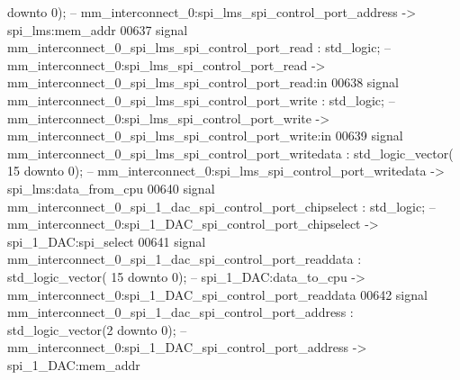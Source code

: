 \begin{DoxyCode}
       \textcolor{keywordflow}{downto} \textcolor{vhdllogic}{}\textcolor{vhdllogic}{0}\textcolor{vhdlchar}{)};\textcolor{keyword}{  -- mm\_interconnect\_0:spi\_lms\_spi\_control\_port\_address -> spi\_lms:mem\_addr}
00637     \textcolor{keywordflow}{signal} \textcolor{vhdlchar}{mm_interconnect_0_spi_lms_spi_control_port_read}                             \textcolor{vhdlchar}{:} \textcolor{comment}{std\_logic};\textcolor{keyword}{        
                   -- mm\_interconnect\_0:spi\_lms\_spi\_control\_port\_read ->
       mm\_interconnect\_0\_spi\_lms\_spi\_control\_port\_read:in}
00638     \textcolor{keywordflow}{signal} \textcolor{vhdlchar}{mm_interconnect_0_spi_lms_spi_control_port_write}                            \textcolor{vhdlchar}{:} \textcolor{comment}{std\_logic};\textcolor{keyword}{        
                   -- mm\_interconnect\_0:spi\_lms\_spi\_control\_port\_write ->
       mm\_interconnect\_0\_spi\_lms\_spi\_control\_port\_write:in}
00639     \textcolor{keywordflow}{signal} \textcolor{vhdlchar}{mm_interconnect_0_spi_lms_spi_control_port_writedata}                        \textcolor{vhdlchar}{:} \textcolor{comment}{std\_logic\_vector}\textcolor{vhdlchar}{(}\textcolor{vhdllogic}{}\textcolor{vhdllogic}{
      15} \textcolor{keywordflow}{downto} \textcolor{vhdllogic}{}\textcolor{vhdllogic}{0}\textcolor{vhdlchar}{)};\textcolor{keyword}{ -- mm\_interconnect\_0:spi\_lms\_spi\_control\_port\_writedata -> spi\_lms:data\_from\_cpu}
00640     \textcolor{keywordflow}{signal} \textcolor{vhdlchar}{mm_interconnect_0_spi_1_dac_spi_control_port_chipselect}                     \textcolor{vhdlchar}{:} \textcolor{comment}{std\_logic};\textcolor{keyword}{        
                   -- mm\_interconnect\_0:spi\_1\_DAC\_spi\_control\_port\_chipselect -> spi\_1\_DAC:spi\_select}
00641     \textcolor{keywordflow}{signal} \textcolor{vhdlchar}{mm_interconnect_0_spi_1_dac_spi_control_port_readdata}                       \textcolor{vhdlchar}{:} \textcolor{comment}{std\_logic\_vector}\textcolor{vhdlchar}{(}\textcolor{vhdllogic}{}\textcolor{vhdllogic}{
      15} \textcolor{keywordflow}{downto} \textcolor{vhdllogic}{}\textcolor{vhdllogic}{0}\textcolor{vhdlchar}{)};\textcolor{keyword}{ -- spi\_1\_DAC:data\_to\_cpu -> mm\_interconnect\_0:spi\_1\_DAC\_spi\_control\_port\_readdata}
00642     \textcolor{keywordflow}{signal} \textcolor{vhdlchar}{mm_interconnect_0_spi_1_dac_spi_control_port_address}                        \textcolor{vhdlchar}{:} \textcolor{comment}{std\_logic\_vector}\textcolor{vhdlchar}{(}\textcolor{vhdllogic}{}\textcolor{vhdllogic}{2}
       \textcolor{keywordflow}{downto} \textcolor{vhdllogic}{}\textcolor{vhdllogic}{0}\textcolor{vhdlchar}{)};\textcolor{keyword}{  -- mm\_interconnect\_0:spi\_1\_DAC\_spi\_control\_port\_address -> spi\_1\_DAC:mem\_addr}

\end{DoxyCode}
